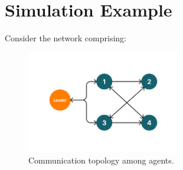 \documentclass[journal,onecolumn]{IEEEtran}
\begin{document}

\section{Simulation Example}



Consider the network comprising:

\begin{figure}[H]
    \centering
    \includegraphics[width=0.6\textwidth]{communication.png}
    \caption{Communication topology among agents.}
    \label{fig:communication1} %
\end{figure}
\end{document}
